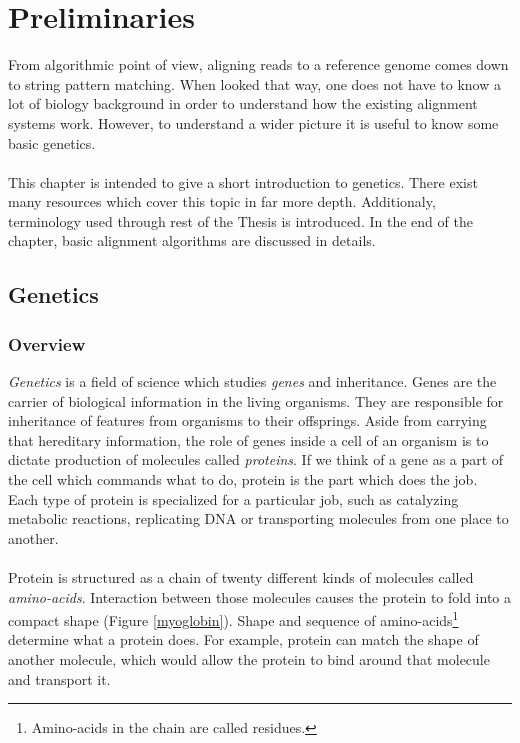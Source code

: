 \documentclass[times, utf8, diplomski]{fer}
\begin{document}
\chapter{Preliminaries}

From algorithmic point of view, aligning reads to a reference genome comes down to string pattern matching. When looked that way, one does not have to know a lot of biology background in order to understand how the existing alignment systems work. However, to understand a wider picture it is useful to know some basic genetics. 
\\
\\
This chapter is intended to give a short introduction to genetics. There exist many resources which cover this topic in far more depth\cite{griffiths,brown}. Additionaly, terminology used through rest of the Thesis is introduced. In the end of the chapter, basic alignment algorithms are discussed in details.

\section{Genetics}
\subsection{Overview}

\emph{Genetics} is a field of science which studies \emph{genes} and inheritance. Genes are the carrier of biological information in the living organisms. They are responsible for inheritance of features from organisms to their offsprings. Aside from carrying that hereditary information, the role of genes inside a cell of an organism is to dictate production of molecules called \emph{proteins}. If we think of a gene as a part of the cell which commands what to do, protein is the part which does the job. Each type of protein is specialized for a particular job, such as catalyzing metabolic reactions, replicating  DNA or transporting molecules from one place to another.
\\
\\
Protein is structured as a chain of twenty different kinds of molecules called \emph{amino-acids}. Interaction between those molecules causes the protein to fold into a compact shape (Figure \ref{myoglobin}). Shape and sequence of amino-acids\footnote{Amino-acids in the chain are called residues.} determine what a protein does. For example, protein can match the shape of another molecule, which would allow the protein to bind around that molecule and transport it.
\end{document}
